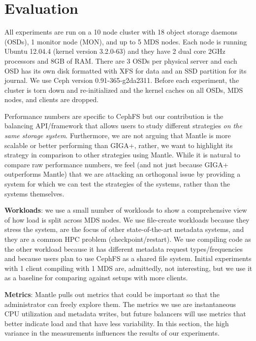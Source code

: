 \section{Evaluation}									%
\label{evaluation}										%
All experiments are run on a 10 node cluster with 18 object storage daemons (OSDs), 1 monitor node (MON), and up to 5 MDS nodes. Each node is running Ubuntu 12.04.4 (kernel version 3.2.0-63) and they have 2 dual core 2GHz processors and 8GB of RAM. There are 3 OSDs per physical server and each OSD has its own disk formatted with XFS for data and an SSD partition for its journal. We use Ceph version 0.91-365-g2da2311. Before each experiment, the cluster is torn down and re-initialized and the kernel caches on all OSDs, MDS nodes, and clients are dropped. 

Performance numbers are specific to CephFS but our contribution is the balancing API/framework that allows users to study different strategies {\it on the same storage system}.  Furthermore, we are not arguing that Mantle is more scalable or better performing than GIGA+, rather, we want to highlight its strategy in comparison to other strategies using Mantle. While it is natural to compare raw performance numbers, we feel (and not just because GIGA+ outperforms Mantle) that we are attacking an orthogonal issue by providing a system for which we can test the strategies of the systems, rather than the systems themselves. 

\textbf{Workloads}: we use a small number of workloads to show a comprehensive view of how load is split across MDS nodes. We use file-create workloads because they stress the system, are the focus of other state-of-the-art metadata systems, and they are a common HPC problem (checkpoint/restart). We use compiling code as the other workload because it has different metadata request types/frequencies and because users plan to use CephFS as a shared file system. Initial experiments with 1 client compiling with 1 MDS are, admittedly, not interesting, but we use it as a baseline for comparing against setups with more clients. 

\textbf{Metrics}: Mantle pulls out metrics that could be important so that the administrator can freely explore them. The metrics we use are instantaneous CPU utilization and metadata writes, but future balancers will use metrics that better indicate load and that have less variability. In this section, the high variance in the measurements influences the results of our experiments.

